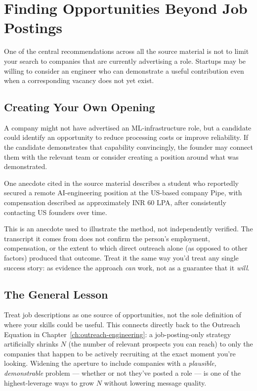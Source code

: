 \chapter{Finding Opportunities Beyond Job Postings}
\label{ch:beyond-postings}

One of the central recommendations across all the source material is not to limit your search to companies that
are currently advertising a role. Startups may be willing to consider an engineer who can demonstrate a useful
contribution even when a corresponding vacancy does not yet exist.

\section{Creating Your Own Opening}

A company might not have advertised an ML-infrastructure role, but a candidate could identify an opportunity to
reduce processing costs or improve reliability. If the candidate demonstrates that capability convincingly, the
founder may connect them with the relevant team or consider creating a position around what was demonstrated.

\begin{example}
One anecdote cited in the source material describes a student who reportedly secured a remote AI-engineering
position at the US-based company Pipe, with compensation described as approximately INR 60 LPA, after
consistently contacting US founders over time.
\end{example}

\begin{caution}
This is an anecdote used to illustrate the method, not independently verified. The transcript it comes from does
not confirm the person's employment, compensation, or the extent to which direct outreach alone (as opposed to
other factors) produced that outcome. Treat it the same way you'd treat any single success story: as evidence the
approach \emph{can} work, not as a guarantee that it \emph{will}.
\end{caution}

\section{The General Lesson}

Treat job descriptions as one source of opportunities, not the sole definition of where your skills could be
useful. This connects directly back to the Outreach Equation in Chapter~\ref{ch:outreach-engineering}: a
job-posting-only strategy artificially shrinks $N$ (the number of relevant prospects you can reach) to only the
companies that happen to be actively recruiting at the exact moment you're looking. Widening the aperture to
include companies with a \emph{plausible, demonstrable} problem --- whether or not they've posted a role --- is
one of the highest-leverage ways to grow $N$ without lowering message quality.

